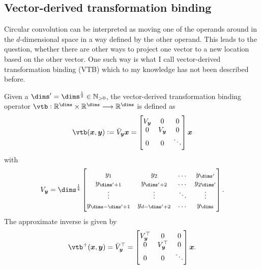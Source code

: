 \subsection{Vector-derived transformation binding}
Circular convolution can be interpreted as moving one of the operands around in the $d$-dimensional space in a way defined by the other operand.
This leads to the question, whether there are other ways to project one vector to a new location based on the other vector.
One such way is what I call vector-derived transformation binding (VTB) which to my knowledge has not been described before.
\begin{defn}
    Given a $\dims' = \dims^{\frac{1}{2}} \in \mathbb{N}_{>0}$, the vector-derived transformation binding operator $\vtb: \mathbb{R}^{\dims} \times \mathbb{R}^{\dims} \longrightarrow \mathbb{R}^{\dims}$ is defined as
    \begin{equation}
        \vtb(\vc x, \vc y) := \bar{\mat V}_{\vc y} \vc x = \begin{bmatrix}
            \mat V_{\vc y} & 0 & 0 \\
            0 & \mat V_{\vc y} & 0 \\
            0 & 0 & \ddots
        \end{bmatrix} \vc x
    \end{equation}
    with
    \begin{equation}
        \mat V_{\vc y} = \dims^{\frac{1}{4}} \begin{bmatrix}
            y_1 & y_2 & \dotso & y_{\dims'} \\
            y_{\dims' + 1} & y_{\dims' + 2} & \dotso & y_{2\dims'} \\
            \vdots & \vdots & \ddots & \vdots \\
            y_{\dims - \dims' + 1} & y_{d - \dims' + 2} & \dotso & y_{\dims}
        \end{bmatrix} \text{.}
    \end{equation}
    The approximate inverse is given by
    \begin{equation}
        \vtb^+(\vc x, \vc y) = \bar{\mat V}_{\vc y}\Tr = \begin{bmatrix}
            V_{\vc y}\Tr & 0 & 0 \\
            0 & V_{\vc y}\Tr & 0 \\
            0 & 0 & \ddots
        \end{bmatrix} \vc x \text{.}
    \end{equation}
\end{defn}
